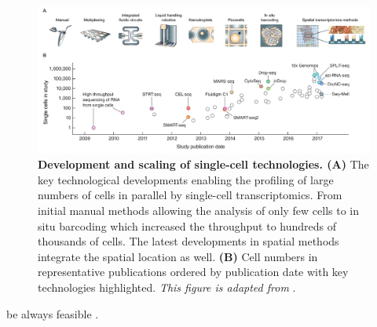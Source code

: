 \begin{figure}[t]
    \centering
    \includegraphics[width=\linewidth]{Chapter1/Fig/F1-5-02.png}
    \caption[Development and scaling of single-cell technologies]{\textbf{Development and scaling of single-cell technologies. (A)} The key technological developments enabling the profiling of large numbers of cells in parallel by single-cell transcriptomics. From initial manual methods allowing the analysis of only few cells to in situ barcoding which increased the throughput to hundreds of thousands of cells. The latest developments in spatial methods integrate the spatial location as well. \textbf{(B)} Cell numbers in representative publications ordered by publication date with key technologies highlighted. \textit{This figure is adapted from} \textbf{\cite{aldridge_single_2020,svensson_exponential_2018}}. }
    \label{fig:chp1_scrna-1}
\end{figure}

be always feasible \textbf{\cite{kalisky_brief_2018}}.\\

